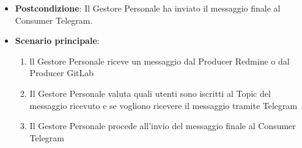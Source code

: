 \begin{itemize}
		\item \textbf{Postcondizione}: Il Gestore Personale ha inviato il messaggio finale al Consumer Telegram.
		\item \textbf{Scenario principale}: 
		\begin{enumerate}
			\item ll Gestore Personale riceve un messaggio dal Producer Redmine o dal Producer GitLab
			\item Il Gestore Personale valuta quali utenti sono iscritti al Topic del messaggio ricevuto e se vogliono ricevere il messaggio tramite Telegram
			\item Il Gestore Personale procede all'invio del messaggio finale al Consumer Telegram
		\end{enumerate}
		
	\end{itemize}